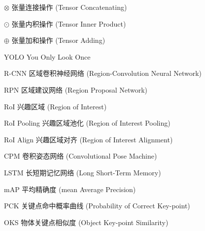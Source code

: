 \begin{denotation}[3cm]
\item[$\otimes$] 张量连接操作 (Tensor Concatenating)
\item[$\odot$] 张量内积操作 (Tensor Inner Product)
\item[$\oplus$] 张量加和操作 (Tensor Adding)
\item[YOLO] You Only Look Once\cite{redmon2016you}
\item[R-CNN] 区域卷积神经网络 (Region-Convolution Neural Network)
\item[RPN] 区域建议网络 (Region Proposal Network)
\item[RoI] 兴趣区域 (Region of Interest)
\item[RoI Pooling] 兴趣区域池化 (Region of Interest Pooling)
\item[RoI Align] 兴趣区域对齐 (Region of Interest Alignment)
\item[CPM] 卷积姿态网络 (Convolutional Pose Machine)
\item[LSTM] 长短期记忆网络 (Long Short-Term Memory)
\item[mAP] 平均精确度 (mean Average Precision)
\item[PCK] 关键点命中概率曲线 (Probability of Correct Key-point)
\item[OKS] 物体关键点相似度 (Object Key-point Similarity)
\end{denotation}

